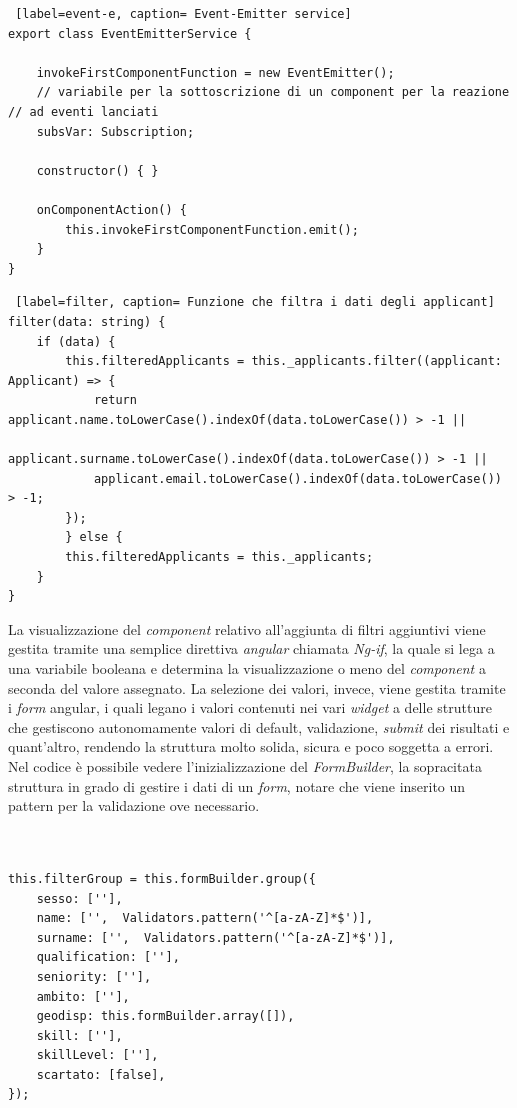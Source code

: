 \begin{lstlisting} [label=event-e, caption= Event-Emitter service]
export class EventEmitterService {

	invokeFirstComponentFunction = new EventEmitter();
	// variabile per la sottoscrizione di un component per la reazione // ad eventi lanciati
	subsVar: Subscription;

	constructor() { }

	onComponentAction() {
		this.invokeFirstComponentFunction.emit();
	}
}
\end{lstlisting}

\begin{lstlisting} [label=filter, caption= Funzione che filtra i dati degli applicant]
filter(data: string) {
	if (data) {
		this.filteredApplicants = this._applicants.filter((applicant: Applicant) => {
			return applicant.name.toLowerCase().indexOf(data.toLowerCase()) > -1 ||
			applicant.surname.toLowerCase().indexOf(data.toLowerCase()) > -1 ||
			applicant.email.toLowerCase().indexOf(data.toLowerCase()) > -1;
		});
		} else {
		this.filteredApplicants = this._applicants;
	}
}

\end{lstlisting}

La visualizzazione del \textit{component} relativo all'aggiunta di filtri aggiuntivi viene gestita tramite una semplice direttiva \textit{angular} chiamata \textit{Ng-if}, la quale si lega a una variabile booleana e determina la visualizzazione o meno del \textit{component} a seconda del valore assegnato. La selezione dei valori, invece, viene gestita tramite i \textit{form} angular, i quali legano i valori contenuti nei vari \textit{widget} a delle strutture che gestiscono autonomamente valori di default, validazione, \textit{submit} dei risultati e quant'altro, rendendo la struttura molto solida, sicura e poco soggetta a errori.
Nel codice è possibile vedere l'inizializzazione del \textit{FormBuilder}, la sopracitata struttura in grado di gestire i dati di un \textit{form}, notare che viene inserito un pattern per la validazione ove necessario.
\newpage
\begin{lstlisting}[label= form, caption= Inizializzazione di un FormBuilder]


this.filterGroup = this.formBuilder.group({
	sesso: [''],
	name: ['',  Validators.pattern('^[a-zA-Z]*$')],
	surname: ['',  Validators.pattern('^[a-zA-Z]*$')],
	qualification: [''],
	seniority: [''],
	ambito: [''],
	geodisp: this.formBuilder.array([]),
	skill: [''],
	skillLevel: [''],
	scartato: [false],
});

\end{lstlisting}

